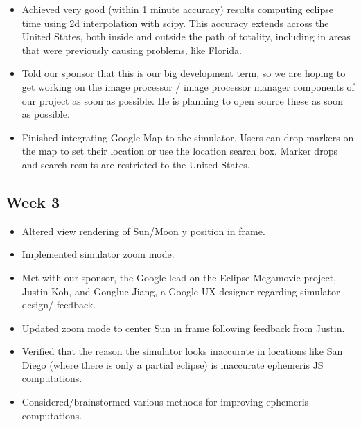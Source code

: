 \documentclass[10pt, onecolumn, draftclsnofoot, letterpaper, compsoc]{IEEEtran}
\begin{document}
    \begin{itemize}

    \item Achieved very good (within 1 minute accuracy) results computing eclipse time
		  using 2d interpolation with scipy. This accuracy extends across the United
		  States, both inside and outside the path of totality, including in areas that
		  were previously causing problems, like Florida.

	\item Told our sponsor that this is our big development term, so we are hoping to get
		  working on the image processor / image processor manager components of our
		  project as soon as possible. He is planning to open source these as soon as
		  possible.

    \item Finished integrating Google Map to the simulator. Users can drop markers on the
          map to set their location or use the location search box. Marker drops and search
          results are restricted to the United States.

    \end{itemize}

\subsection{Week 3}

    \begin{itemize}

    \item Altered view rendering of Sun/Moon y position in frame.

	\item Implemented simulator zoom mode.

	\item Met with our sponsor, the Google lead on the Eclipse Megamovie project,
		  Justin Koh, and Gonglue Jiang, a Google UX designer regarding simulator design/
		  feedback.

	\item Updated zoom mode to center Sun in frame following feedback from Justin.

	\item Verified that the reason the simulator looks inaccurate in locations like San
		  Diego (where there is only a partial eclipse) is inaccurate ephemeris JS
		  computations.

	\item Considered/brainstormed various methods for improving ephemeris computations.

    \end{itemize}
\end{document}
